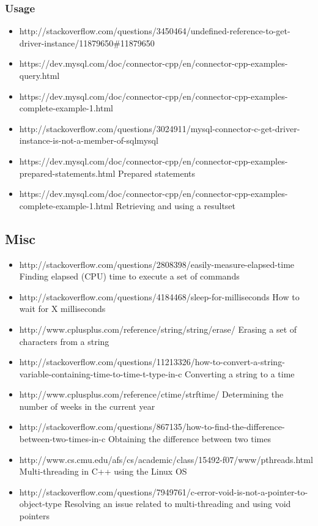 \documentclass[12pt]{article}
\begin{document}
	\subsubsection{Usage}
		\begin{itemize}
			\item http://stackoverflow.com/questions/3450464/undefined-reference-to-get-driver-instance/11879650\#11879650
			\item https://dev.mysql.com/doc/connector-cpp/en/connector-cpp-examples-query.html
			\item https://dev.mysql.com/doc/connector-cpp/en/connector-cpp-examples-complete-example-1.html
			\item http://stackoverflow.com/questions/3024911/mysql-connector-c-get-driver-instance-is-not-a-member-of-sqlmysql
			\item https://dev.mysql.com/doc/connector-cpp/en/connector-cpp-examples-prepared-statements.html
				\subitem Prepared statements
			\item https://dev.mysql.com/doc/connector-cpp/en/connector-cpp-examples-complete-example-1.html
				\subitem Retrieving and using a resultset
		\end{itemize}
	\subsection{Misc}
		\begin{itemize}
			\item http://stackoverflow.com/questions/2808398/easily-measure-elapsed-time
			\subitem Finding elapsed (CPU) time to execute a set of commands
			\item http://stackoverflow.com/questions/4184468/sleep-for-milliseconds
			\subitem How to wait for X milliseconds
			\item http://www.cplusplus.com/reference/string/string/erase/
			\subitem Erasing a set of characters from a string
			\item http://stackoverflow.com/questions/11213326/how-to-convert-a-string-variable-containing-time-to-time-t-type-in-c
			\subitem Converting a string to a time
			\item http://www.cplusplus.com/reference/ctime/strftime/
			\subitem Determining the number of weeks in the current year
			\item http://stackoverflow.com/questions/867135/how-to-find-the-difference-between-two-times-in-c
			\subitem Obtaining the difference between two times
			\item http://www.cs.cmu.edu/afs/cs/academic/class/15492-f07/www/pthreads.html
			\subitem Multi-threading in C++ using the Linux OS
			\item http://stackoverflow.com/questions/7949761/c-error-void-is-not-a-pointer-to-object-type
			\subitem Resolving an issue related to multi-threading and using void pointers
		\end{itemize}
\end{document}
